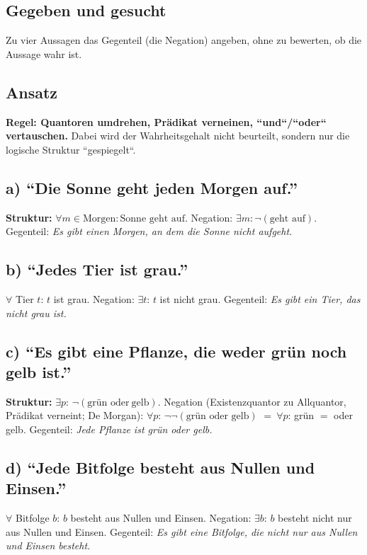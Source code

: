 

\subsection*{Gegeben und gesucht}
Zu vier Aussagen das Gegenteil (die Negation) angeben, ohne zu bewerten,
ob die Aussage wahr ist.

\subsection*{Ansatz}
\textbf{Regel: Quantoren umdrehen, Prädikat verneinen, ``und``/``oder``
vertauschen.} Dabei wird der Wahrheitsgehalt nicht beurteilt, sondern nur
die logische Struktur ``gespiegelt``.

\subsection*{a) ``Die Sonne geht jeden Morgen auf.''}
\textbf{Struktur:} $\forall m \in \text{Morgen}: \text{Sonne geht auf}$.
Negation: $\exists m: \neg(\text{geht auf})$.
Gegenteil: \emph{Es gibt einen Morgen, an dem die Sonne nicht aufgeht.}

\subsection*{b) ``Jedes Tier ist grau.''}
$\forall$ Tier $t$: $t$ ist grau. Negation: $\exists t$: $t$ ist nicht
grau.
Gegenteil: \emph{Es gibt ein Tier, das nicht grau ist.}

\subsection*{c) ``Es gibt eine Pflanze, die weder grün noch gelb ist.''}
\textbf{Struktur:} $\exists p$: $\neg(\text{grün } \text{oder}\ \text{gelb})$.
Negation (Existenzquantor zu Allquantor, Prädikat verneint; De Morgan):
$\forall p$: $\neg\neg(\text{grün oder gelb})$
$=\ \forall p$: grün $=$ oder gelb.
Gegenteil: \emph{Jede Pflanze ist grün oder gelb.}

\subsection*{d) ``Jede Bitfolge besteht aus Nullen und Einsen.''}
$\forall$ Bitfolge $b$: $b$ besteht aus Nullen und Einsen. Negation:
$\exists b$: $b$ besteht nicht nur aus Nullen und Einsen.
Gegenteil: \emph{Es gibt eine Bitfolge, die nicht nur aus Nullen und
Einsen besteht.}

